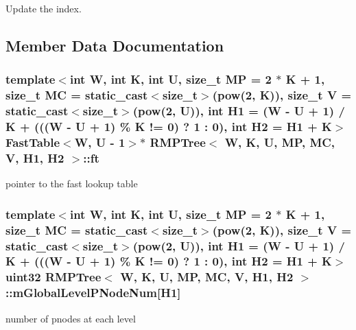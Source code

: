 Update the index. 



\subsection{Member Data Documentation}
\hypertarget{classRMPTree_ad94614dd338215403c0e46d8f3bed5e1}{
\subsubsection[{ft}]{\setlength{\rightskip}{0pt plus 5cm}template$<$int W, int K, int U, size\-\_\-t M\-P = 2 $\ast$ K + 1, size\-\_\-t M\-C = static\-\_\-cast$<$size\-\_\-t$>$(pow(2, K)), size\-\_\-t V = static\-\_\-cast$<$size\-\_\-t$>$(pow(2, U)), int H1 = (\-W -\/ U + 1) / K + (((\-W -\/ U + 1) \% K != 0) ? 1 \-: 0), int H2 = H1 + K$>$ {\bf Fast\-Table}$<${\bf W}, U -\/ 1$>$$\ast$ {\bf R\-M\-P\-Tree}$<$ {\bf W}, K, U, M\-P, M\-C, V, H1, H2 $>$\-::ft\hspace{0.3cm}{\ttfamily [private]}}}\label{classRMPTree_ad94614dd338215403c0e46d8f3bed5e1}


pointer to the fast lookup table 

\hypertarget{classRMPTree_a5bfe436635f93a065affd03637d6b361}{
\subsubsection[{m\-Global\-Level\-P\-Node\-Num}]{\setlength{\rightskip}{0pt plus 5cm}template$<$int W, int K, int U, size\-\_\-t M\-P = 2 $\ast$ K + 1, size\-\_\-t M\-C = static\-\_\-cast$<$size\-\_\-t$>$(pow(2, K)), size\-\_\-t V = static\-\_\-cast$<$size\-\_\-t$>$(pow(2, U)), int H1 = (\-W -\/ U + 1) / K + (((\-W -\/ U + 1) \% K != 0) ? 1 \-: 0), int H2 = H1 + K$>$ {\bf uint32} {\bf R\-M\-P\-Tree}$<$ {\bf W}, K, U, M\-P, M\-C, V, H1, H2 $>$\-::m\-Global\-Level\-P\-Node\-Num\mbox{[}H1\mbox{]}\hspace{0.3cm}{\ttfamily [private]}}}\label{classRMPTree_a5bfe436635f93a065affd03637d6b361}


number of pnodes at each level 

